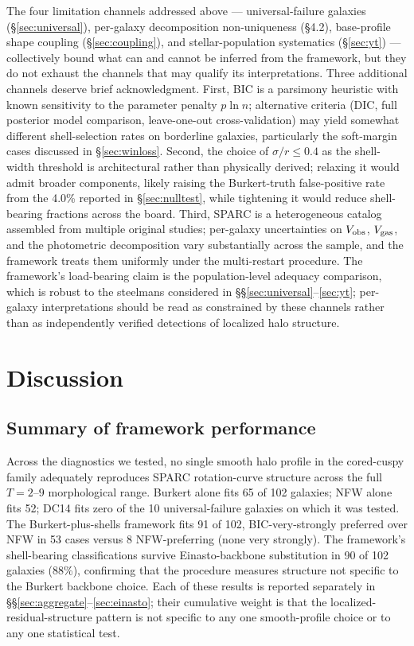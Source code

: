 \documentclass[linenumbers]{aastex701}
\newcommand{\Vobs}{V_{\rm obs}}
\newcommand{\Vgas}{V_{\rm gas}}
\begin{document}
The four limitation channels addressed above --- universal-failure galaxies (\S\ref{sec:universal}), per-galaxy decomposition non-uniqueness (\S4.2), base-profile shape coupling (\S\ref{sec:coupling}), and stellar-population systematics (\S\ref{sec:yt}) --- collectively bound what can and cannot be inferred from the framework, but they do not exhaust the channels that may qualify its interpretations. Three additional channels deserve brief acknowledgment. First, BIC is a parsimony heuristic with known sensitivity to the parameter penalty $p \ln n$; alternative criteria (DIC, full posterior model comparison, leave-one-out cross-validation) may yield somewhat different shell-selection rates on borderline galaxies, particularly the soft-margin cases discussed in \S\ref{sec:winloss}. Second, the choice of $\sigma/r \le 0.4$ as the shell-width threshold is architectural rather than physically derived; relaxing it would admit broader components, likely raising the Burkert-truth false-positive rate from the 4.0\% reported in \S\ref{sec:nulltest}, while tightening it would reduce shell-bearing fractions across the board. Third, SPARC is a heterogeneous catalog assembled from multiple original studies; per-galaxy uncertainties on $\Vobs$, $\Vgas$, and the photometric decomposition vary substantially across the sample, and the framework treats them uniformly under the multi-restart procedure. The framework's load-bearing claim is the population-level adequacy comparison, which is robust to the steelmans considered in \S\S\ref{sec:universal}--\ref{sec:yt}; per-galaxy interpretations should be read as constrained by these channels rather than as independently verified detections of localized halo structure.


\section{Discussion}\label{sec:discussion}

\subsection{Summary of framework performance}\label{sec:summary}

Across the diagnostics we tested, no single smooth halo profile in the cored-cuspy family adequately reproduces SPARC rotation-curve structure across the full $T=2$--$9$ morphological range. Burkert alone fits 65 of 102 galaxies; NFW alone fits 52; DC14 fits zero of the 10 universal-failure galaxies on which it was tested. The Burkert-plus-shells framework fits 91 of 102, BIC-very-strongly preferred over NFW in 53 cases versus 8 NFW-preferring (none very strongly). The framework's shell-bearing classifications survive Einasto-backbone substitution in 90 of 102 galaxies (88\%), confirming that the procedure measures structure not specific to the Burkert backbone choice. Each of these results is reported separately in \S\S\ref{sec:aggregate}--\ref{sec:einasto}; their cumulative weight is that the localized-residual-structure pattern is not specific to any one smooth-profile choice or to any one statistical test.
\end{document}
